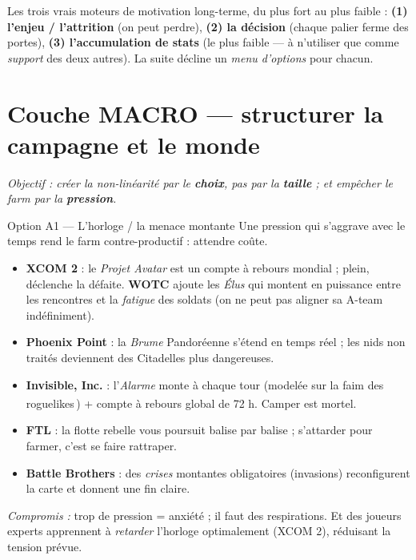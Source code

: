 \documentclass[11pt,a4paper]{article}
\newcommand{\dv}{\,\textsuperscript{\textcolor{accent2}{\textdagger}}}
\newcommand{\jeu}[1]{\textbf{#1}}
\newcommand{\compromis}[1]{\par\smallskip\textit{\textcolor{warn}{Compromis :}} #1}
\begin{document}
\begin{principe}
Les trois vrais moteurs de motivation long-terme, du plus fort au plus faible : \textbf{(1) l'enjeu / l'attrition} (on peut perdre), \textbf{(2) la décision} (chaque palier ferme des portes), \textbf{(3) l'accumulation de stats} (le plus faible — à n'utiliser que comme \emph{support} des deux autres). La suite décline un \emph{menu d'options} pour chacun.
\end{principe}

\section{Couche MACRO --- structurer la campagne et le monde}
\emph{Objectif : créer la non-linéarité par le \textbf{choix}, pas par la \textbf{taille} ; et empêcher le farm par la \textbf{pression}.}

\begin{optionbox}{Option A1 --- L'horloge / la menace montante}
Une pression qui s'aggrave avec le temps rend le farm contre-productif : attendre coûte.
\begin{itemize}
\item \jeu{XCOM 2} : le \emph{Projet Avatar} est un compte à rebours mondial ; plein, déclenche la défaite. \jeu{WOTC} ajoute les \emph{Élus} qui montent en puissance entre les rencontres et la \emph{fatigue} des soldats (on ne peut pas aligner sa A-team indéfiniment).
\item \jeu{Phoenix Point} : la \emph{Brume} Pandoréenne s'étend en temps réel ; les nids non traités deviennent des Citadelles plus dangereuses.
\item \jeu{Invisible, Inc.} : l'\emph{Alarme} monte à chaque tour (modelée sur la faim des roguelikes\dv) + compte à rebours global de 72 h. Camper est mortel.
\item \jeu{FTL} : la flotte rebelle vous poursuit balise par balise ; s'attarder pour farmer, c'est se faire rattraper.
\item \jeu{Battle Brothers} : des \emph{crises} montantes obligatoires (invasions) reconfigurent la carte et donnent une fin claire.
\end{itemize}
\compromis{trop de pression = anxiété ; il faut des respirations. Et des joueurs experts apprennent à \emph{retarder} l'horloge optimalement (XCOM 2), réduisant la tension prévue.}
\end{optionbox}
\end{document}
